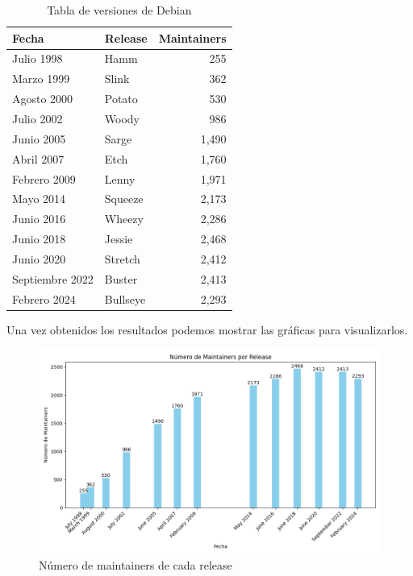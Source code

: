 \documentclass[a4paper, 12pt]{book}
\begin{document}
\begin{table}[h]
	\begin{center}
		\begin{tabular}{|l|l|r|} %
			\hline
			Fecha           & Release  & Maintainers \\ \hline
			Julio 1998      & Hamm     & 255         \\ \hline
			Marzo 1999      & Slink    & 362         \\ \hline
			Agosto 2000     & Potato   & 530         \\ \hline
			Julio 2002      & Woody    & 986         \\ \hline
			Junio 2005      & Sarge    & 1,490       \\ \hline
			Abril 2007      & Etch     & 1,760       \\ \hline
			Febrero 2009    & Lenny    & 1,971       \\ \hline
			Mayo 2014       & Squeeze  & 2,173       \\ \hline
			Junio 2016      & Wheezy   & 2,286       \\ \hline
			Junio 2018      & Jessie   & 2,468       \\ \hline
			Junio 2020      & Stretch  & 2,412       \\ \hline
			Septiembre 2022 & Buster   & 2,413       \\ \hline
			Febrero 2024    & Bullseye & 2,293       \\ \hline
		\end{tabular}
		\caption{Tabla de versiones de Debian}
	\end{center}
\end{table}



Una vez obtenidos los resultados podemos mostrar las gráficas para visualizarlos.
\begin{figure}
	\centering
	\includegraphics[width=15cm, keepaspectratio]{img/Figura2_buena_maintainers.png}
	\caption{Número de maintainers de cada release}
	\label{fig:mantenedores}
\end{figure}
\end{document}
